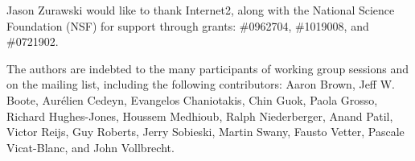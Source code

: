 \documentclass[12pt]{article}  %
\begin{document}
Jason Zurawski would like to thank Internet2, along with the National Science Foundation (NSF) for support through grants: \#0962704, \#1019008, and \#0721902.

The authors are indebted to the many participants of working group sessions and on the mailing list, including the following contributors: 
Aaron Brown,
Jeff W. Boote, 
Aur\'elien Cedeyn, 
Evangelos Chaniotakis, 
Chin Guok, 
Paola Grosso, 
Richard Hughes-Jones, 
Houssem Medhioub, 
Ralph Niederberger, 
Anand Patil, 
Victor Reijs, 
Guy Roberts, 
Jerry Sobieski, 
Martin Swany, 
Fausto Vetter, 
Pascale Vicat-Blanc, and
John Vollbrecht.


 

\begin{appendices}
	
	
	
\end{appendices}

 
\end{document}
